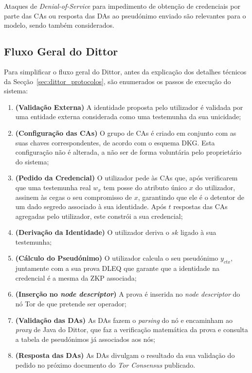 Ataques de \textit{Denial-of-Service} para impedimento de obtenção de credenciais por parte das CAs ou resposta das DAs ao pseudónimo enviado são relevantes para o modelo, sendo também considerados.

\subsection{Fluxo Geral do Dittor}
\label{sub:dittor_fluxo_geral}

Para simplificar o fluxo geral do Dittor, antes da explicação dos detalhes técnicos da Secção~\ref{sec:dittor_protocolos}, são enumerados os passos de execução do sistema:

\begin{enumerate}
    \item \textbf{(Validação Externa)} A identidade proposta pelo utilizador é validada por uma entidade externa considerada como uma testemunha da sua unicidade;
    \item \textbf{(Configuração das CAs)} O grupo de CAs é criado em conjunto com as suas chaves correspondentes, de acordo com o esquema DKG. Esta configuração não é alterada, a não ser de forma voluntária pelo proprietário do sistema;
    \item \textbf{(Pedido da Credencial)} O utilizador pede às CAs que, após verificarem que uma testemunha real $w_x$ tem posse do atributo único $x$ do utilizador, assinem às cegas o seu compromisso de $x$, garantindo que ele é o detentor de um dado segredo associado à sua identidade. Após $t$ respostas das CAs agregadas pelo utilizador, este constrói a sua credencial;
    \item \textbf{(Derivação da Identidade)} O utilizador deriva o $sk$ ligado à sua testemunha;
    \item \textbf{(Cálculo do Pseudónimo)} O utilizador calcula o seu pseudónimo $y_{ctx}$, juntamente com a sua prova DLEQ que garante que a identidade na credencial é a mesma da ZKP associada;
    \item \textbf{(Inserção no \textit{node descriptor})} A prova é inserida no \textit{node descriptor} do nó Tor de que pretende ser operador;
    \item \textbf{(Validação das DAs)} As DAs fazem o \textit{parsing} do nó e encaminham ao \textit{proxy} de Java do Dittor, que faz a verificação matemática da prova e consulta a tabela de pseudónimos já associados aos nós;
    \item \textbf{(Resposta das DAs)} As DAs divulgam o resultado da sua validação do pedido no próximo documento do \textit{Tor Consensus} publicado.
\end{enumerate}

